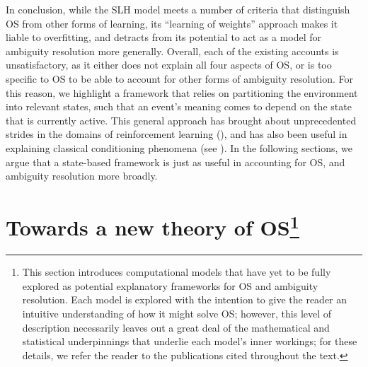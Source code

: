 \documentclass[11pt]{article}
\let\citeNP=\citealt
\begin{document}
In conclusion, while the SLH model meets a number of criteria that distinguish 
OS from other forms of learning, its ``learning of weights'' approach makes it 
liable to overfitting, and detracts from its potential to act as a model for 
ambiguity resolution more generally. Overall, each of the existing accounts is 
unsatisfactory, as it either does not explain all four aspects of OS, or is too 
specific to OS to be able to account for other forms of ambiguity resolution. 
For this reason, we highlight a framework that relies on partitioning the 
environment into relevant states, such that an event's meaning comes to depend 
on the state that is currently active. This general approach has brought about 
unprecedented strides in the domains of reinforcement learning 
(\citeNP{Sutton1998,Maia2009}), and has also been useful in explaining 
classical conditioning phenomena (see 
\citeNP{Courville2006,Redish2007,Fuhs2007,Gershman2010a,Gershman2010b,Gershman2012}). 
In the following sections, we argue that a state-based framework is just as 
useful in accounting for OS, and ambiguity resolution more broadly.

\section*{Towards a new theory of OS\footnote{This section introduces computational models that have yet to be fully explored as potential explanatory frameworks for OS and ambiguity resolution. Each model is explored with the intention to give the reader an intuitive understanding of how it might solve OS; however, this level of description necessarily leaves out a great deal of the mathematical and statistical underpinnings that underlie each model's inner workings; for these details, we refer the reader to the publications cited throughout the text.}}
\end{document}
